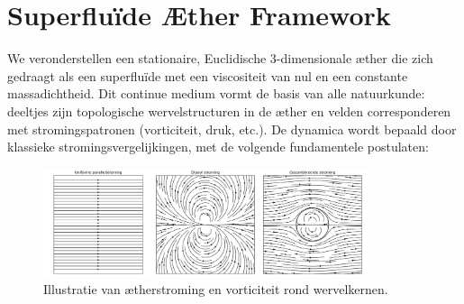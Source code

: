 \section{Superfluïde Æther Framework}

We veronderstellen een stationaire, Euclidische 3-dimensionale æther die zich gedraagt als een superfluïde met een viscositeit van nul en een constante massadichtheid. Dit continue medium vormt de basis van alle natuurkunde: deeltjes zijn topologische wervelstructuren in de æther en velden corresponderen met stromingspatronen (vorticiteit, druk, etc.). De dynamica wordt bepaald door klassieke stromingsvergelijkingen, met de volgende fundamentele postulaten:

\begin{figure}[htbp]
    \centering
    \includegraphics[width=0.85\textwidth]{../03-combined_flow}
    \caption{Illustratie van ætherstroming en vorticiteit rond wervelkernen.}
    \label{fig:vortexfields}
\end{figure}
